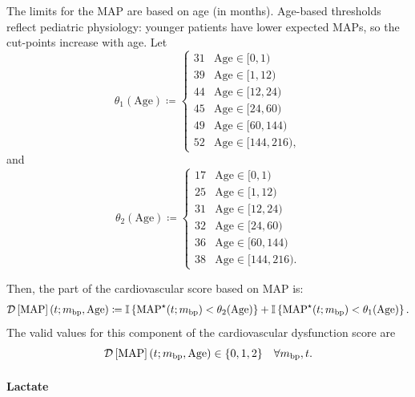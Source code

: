\documentclass[letterpaper,10pt]{article}
\begin{document}
The limits for the MAP are based on age (in months). Age-based
thresholds reflect pediatric physiology: younger patients have lower
expected MAPs, so the cut-points increase with age. Let
\begin{equation}
  \label{eq:theta1}
  \theta_{1}(\mathrm{Age}) \coloneqq
    \begin{cases}
      31 & \mathrm{Age} \in [  0,   1) \\
      39 & \mathrm{Age} \in [  1,  12) \\
      44 & \mathrm{Age} \in [ 12,  24) \\
      45 & \mathrm{Age} \in [ 24,  60) \\
      49 & \mathrm{Age} \in [ 60, 144) \\
      52 & \mathrm{Age} \in [144, 216),
    \end{cases}
\end{equation}
and
\begin{equation}
  \label{eq:theta2}
  \theta_{2}(\mathrm{Age}) \coloneqq
    \begin{cases}
      17 & \mathrm{Age} \in [  0,   1) \\
      25 & \mathrm{Age} \in [  1,  12) \\
      31 & \mathrm{Age} \in [ 12,  24) \\
      32 & \mathrm{Age} \in [ 24,  60) \\
      36 & \mathrm{Age} \in [ 60, 144) \\
      38 & \mathrm{Age} \in [144, 216).
    \end{cases}
\end{equation}


Then, the part of the cardiovascular score based on MAP is:
\begin{equation}
  \label{eq:map}
  \DS{MAP}[\m{bp}, \mathrm{Age}] \coloneqq
    \mathbb{I}\left\{\mathrm{MAP}^{\star}(t; \m{bp}) < \theta_{2}(\mathrm{Age})\right\} +
    \mathbb{I}\left\{\mathrm{MAP}^{\star}(t; \m{bp}) < \theta_{1}(\mathrm{Age})\right\}.
\end{equation}
The valid values for this component of the cardiovascular dysfunction score are
\begin{equation}
  \label{eq:map-valid-values}
  \DS{MAP}[\m{bp}, \mathrm{Age}] \in \{0, 1, 2\} \quad \forall \m{bp},t.
\end{equation}

\paragraph{Lactate}\label{sec:lactate}
\end{document}
